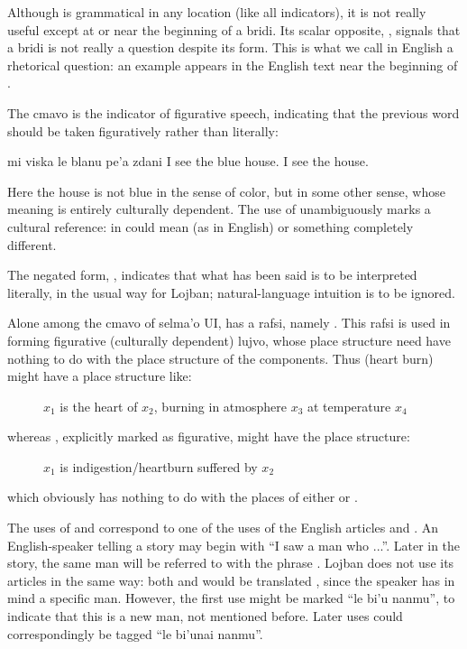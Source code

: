 Although  is grammatical in any location (like all
    indicators), it is not really useful except at or near the
    beginning of a bridi. Its scalar opposite, , signals
    that a bridi is not really a question despite its form. This is
    what we call in English a rhetorical question: an example
    appears in the English text near the beginning of .

The cmavo  is the indicator of figurative speech,
    indicating that the previous word should be taken figuratively
    rather than literally:
\begin{example}
mi viska le blanu pe'a zdani\n
I see the blue  house.\n
I see the  house.
\end{example}

Here the house is not blue in the sense of color, but in
    some other sense, whose meaning is entirely culturally
    dependent. The use of  unambiguously marks a cultural
    reference:  in  could
    mean  (as in English) or something completely
    different.

The negated form, , indicates that what has been
    said is to be interpreted literally, in the usual way for
    Lojban; natural-language intuition is to be ignored.

Alone among the cmavo of selma'o UI,  has a rafsi,
    namely . This rafsi is used in forming figurative
    (culturally dependent) lujvo, whose place structure need have
    nothing to do with the place structure of the components. Thus
     (heart burn) might have a place structure
    like:
\begin{description}
\item[] $x_1$ is the heart of $x_2$, burning in atmosphere $x_3$ at temperature $x_4$
\end{description}

whereas , explicitly marked as figurative,
    might have the place structure: 
\begin{description}
\item[] $x_1$ is indigestion/heartburn suffered by $x_2$
\end{description}

which obviously has nothing to do with the places of either
     or . 

The uses of  and  correspond to one of
    the uses of the English articles  and . An
    English-speaker telling a story may begin with ``I saw a man
    who ...''. Later in the story, the same man will be referred to
    with the phrase . Lojban does not use its articles
    in the same way: both  and  would be
    translated , since the speaker has in mind a
    specific man. However, the first use might be marked ``le bi'u
    nanmu'', to indicate that this is a new man, not mentioned
    before. Later uses could correspondingly be tagged ``le bi'unai
    nanmu''.

